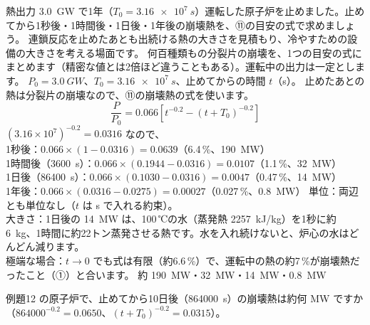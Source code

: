 \label{ph:原-15:ex12}
\begin{phreidai}[止めたあとの崩壊熱]
熱出力 \qty{3.0}{GW} で1年（$T_0=\qty{3.16e7}{s}$）運転した原子炉を止めました。止めてから1秒後・1時間後・1日後・1年後の崩壊熱を、⑪の目安の式で求めましょう。
\phbamen
連鎖反応を止めたあとも出続ける熱の大きさを見積もり、冷やすための設備の大きさを考える場面です。
\phmushi
何百種類もの分裂片の崩壊を、1つの目安の式にまとめます（精密な値とは2倍ほど違うこともある）。運転中の出力は一定とします。
\phzu
$P_0=\qty{3.0}{GW}$、$T_0=\qty{3.16e7}{s}$、止めてからの時間 $t$（s）。
\phriyu
止めたあとの熱は分裂片の崩壊なので、⑪の崩壊熱の式を使います。
\phtateru
\[ \frac{P}{P_0}=0.066\left[t^{-0.2}-(t+T_0)^{-0.2}\right] \]
\phtoku
$(3.16\times10^7)^{-0.2}=0.0316$ なので、\\
1秒後：$0.066\times(1-0.0316)=0.0639$（6.4\,\%、\qty{190}{MW}）\\
1時間後（\qty{3600}{s}）：$0.066\times(0.1944-0.0316)=0.0107$（1.1\,\%、\qty{32}{MW}）\\
1日後（\qty{86400}{s}）：$0.066\times(0.1030-0.0316)=0.0047$（0.47\,\%、\qty{14}{MW}）\\
1年後：$0.066\times(0.0316-0.0275)=0.00027$（0.027\,\%、\qty{0.8}{MW}）
\phtashikame
単位：両辺とも単位なし（$t$ は s で入れる約束）。\\
大きさ：1日後の \qty{14}{MW} は、100\,℃の水（蒸発熱 \qty{2257}{kJ/kg}）を1秒に約 \qty{6}{kg}、1時間に約22トン蒸発させる熱です。水を入れ続けないと、炉心の水はどんどん減ります。\\
極端な場合：$t\to0$ でも式は有限（約6.6\,\%）で、運転中の熱の約7\,\%が崩壊熱だったこと（①）と合います。
\kotae 約 \qty{190}{MW}・\qty{32}{MW}・\qty{14}{MW}・\qty{0.8}{MW}
\end{phreidai}
\begin{jibun}
例題12 の原子炉で、止めてから10日後（\qty{864000}{s}）の崩壊熱は約何 MW ですか（$\num{864000}^{-0.2}=0.0650$、$(t+T_0)^{-0.2}=0.0315$）。
\end{jibun}

